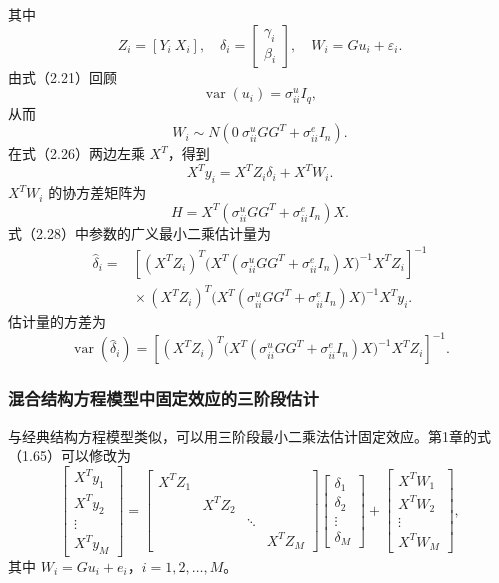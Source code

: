 其中
\[
Z_i=[Y_i\ X_i],\quad
\delta_i=\begin{bmatrix}\gamma_i\\\beta_i\end{bmatrix},
\quad W_i=Gu_i+\varepsilon_i.
\]
由式（2.21）回顾
\[
\operatorname{var}(u_i)=\sigma^u_{ii}I_q,
\]
从而
\begin{equation}
W_i\sim N\left(0\ \sigma^u_{ii}GG^T+\sigma^e_{ii}I_n\right).
\tag{2.27}
\end{equation}
在式（2.26）两边左乘 $X^T$，得到
\begin{equation}
X^Ty_i=X^TZ_i\delta_i+X^TW_i.
\tag{2.28}
\end{equation}
$X^TW_i$ 的协方差矩阵为
\begin{equation}
H=X^T(\sigma^u_{ii}GG^T+\sigma^e_{ii}I_n)X.
\tag{2.29}
\end{equation}
式（2.28）中参数的广义最小二乘估计量为
\begin{equation}
\begin{aligned}
\widehat\delta_i={}&
\left[(X^TZ_i)^T
\bigl(X^T(\sigma^u_{ii}GG^T+\sigma^e_{ii}I_n)X\bigr)^{-1}X^TZ_i\right]^{-1}\\
&{}\times(X^TZ_i)^T
\bigl(X^T(\sigma^u_{ii}GG^T+\sigma^e_{ii}I_n)X\bigr)^{-1}X^Ty_i.
\end{aligned}\tag{2.30}
\end{equation}
估计量的方差为
\begin{equation}
\operatorname{var}(\widehat\delta_i)=
\left[(X^TZ_i)^T
\bigl(X^T(\sigma^u_{ii}GG^T+\sigma^e_{ii}I_n)X\bigr)^{-1}X^TZ_i\right]^{-1}.
\tag{2.31}
\end{equation}

\subsubsection{混合结构方程模型中固定效应的三阶段估计}

与经典结构方程模型类似，可以用三阶段最小二乘法估计固定效应。第1章的式（1.65）可以修改为
\begin{equation}
\begin{bmatrix}X^Ty_1\\X^Ty_2\\\vdots\\X^Ty_M\end{bmatrix}
=
\begin{bmatrix}X^TZ_1&&&\\&X^TZ_2&&\\&&\ddots&\\&&&X^TZ_M\end{bmatrix}
\begin{bmatrix}\delta_1\\\delta_2\\\vdots\\\delta_M\end{bmatrix}
+\begin{bmatrix}X^TW_1\\X^TW_2\\\vdots\\X^TW_M\end{bmatrix},
\tag{2.32}
\end{equation}
其中 $W_i=Gu_i+e_i$，$i=1,2,\ldots,M$。

